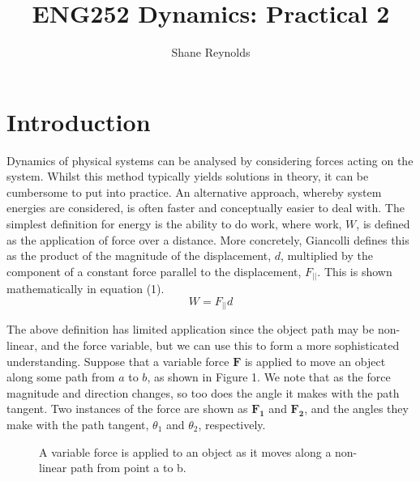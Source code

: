 \documentclass[a4paper]{article}
\begin{document}
\title{ENG252 Dynamics: Practical 2}
\author{Shane Reynolds}
\maketitle

\section{Introduction}
Dynamics of physical systems can be analysed by considering forces acting on the system. Whilst this method typically yields solutions in theory, it can be cumbersome to put into practice. An alternative approach, whereby system energies are considered, is often faster and conceptually easier to deal with. The simplest definition for energy is the ability to do work, where work, $W$, is defined as the application of force over a distance. More concretely, Giancolli defines this as the product of the magnitude of the displacement, $d$, multiplied by the component of a constant force parallel to the displacement, $F_{||}$. This is shown mathematically in equation (1).
\begin{equation}
W = F_{||}d
\end{equation}

The above definition has limited application since the object path may be non-linear, and the force variable, but we can use this to form a more sophisticated understanding. Suppose that a variable force $\boldsymbol{F}$ is applied to move an object along some path from $a$ to $b$, as shown in Figure 1. We note that as the force magnitude and direction changes, so too does the angle it makes with the path tangent. Two instances of the force are shown as $\boldsymbol{F_1}$ and $\boldsymbol{F_2}$, and the angles they make with the path tangent, $\theta_1$ and $\theta_2$, respectively.
\begin{figure}[h]
	\centering
	\caption{A variable force is applied to an object as it moves along a non-linear path from point a to b.}
\end{figure}
\end{document}
